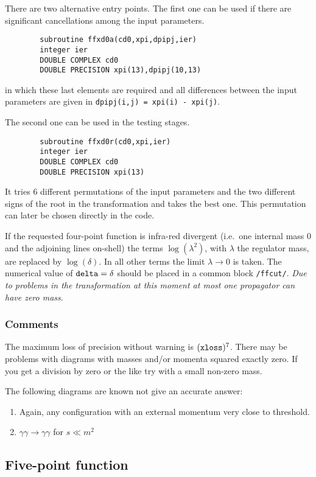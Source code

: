 There are two alternative entry points.  The first one can be used if there 
are significant cancellations among the input parameters.
\begin{verbatim}
        subroutine ffxd0a(cd0,xpi,dpipj,ier)
        integer ier
        DOUBLE COMPLEX cd0
        DOUBLE PRECISION xpi(13),dpipj(10,13)
\end{verbatim}
in which these last elements are required and all differences between the 
input parameters are given in {\tt dpipj(i,j) = xpi(i) - xpi(j)}.

The second one can be used in the testing stages.  
\begin{verbatim}
        subroutine ffxd0r(cd0,xpi,ier)
        integer ier
        DOUBLE COMPLEX cd0
        DOUBLE PRECISION xpi(13)
\end{verbatim}
It tries 6 different permutations of the input parameters and the two 
different signs of the root in the transformation and takes the best one.  
This permutation can later be chosen directly in the code.

If the requested four-point function is infra-red divergent (i.e.\ one 
internal mass 0 and the adjoining lines on-shell) the terms $\log(\lambda^2)$, 
with $\lambda$ the regulator mass, are replaced by $\log(\delta)$.  In all 
other terms the limit $\lambda \to 0$ is taken. The numerical value of 
$\mbox{\tt delta} = \delta$ should be placed in a common block {\tt /ffcut/}.  
{\em Due to problems in the transformation at this moment at most one 
propagator can have zero mass}.

\subsubsection{Comments}

The maximum loss of precision without warning is $(\mbox{\tt xloss})^7$.  
There may be problems with diagrams with masses and/or momenta squared 
exactly zero.  If you get a division by zero or the like try with a 
small non-zero mass.

The following diagrams are known not give an accurate answer:
\begin{enumerate}
\item Again, any configuration with an external momentum very close to 
threshold.
\item $\gamma\gamma \to \gamma\gamma$ for $s \ll m^2$
\end{enumerate}

\subsection{Five-point function}

